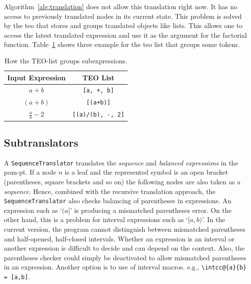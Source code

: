 \documentclass[a4paper,11pt]{article}
\theoremstyle{defTheoStyle}
\theoremstyle{defExampStyle}
\begin{document}
Algorithm~\ref{alg:translation} does not allow this translation right now. It has no access to previously translated nodes in its current state. This problem is solved by the \gls*{teo} that stores and groups translated objects like lists. This allows one to access the latest translated expression and use it as the argument for the factorial function. Table~\ref{tab:teo-list} shows three example for the \gls*{teo} list that groups some tokens.

\begin{table}[ht]
\centering
\begin{tabular}{cc}
	\hline
	Input Expression & TEO List\\
	\hline
	$a+b$ & \verb|[a, +, b]|\\
	$(a+b)$ & \verb|[(a+b)]|\\
	$\frac{a}{b}-2$ & \verb|[(a)/(b), -, 2]|\\
	\hline
\end{tabular}
\caption{How the TEO-list groups subexpressions.}
\label{tab:teo-list}
\end{table}

\subsection{Subtranslators}\label{sec:subtranslators}

A \verb|SequenceTranslator| translates the \textit{sequence} and \textit{balanced expressions} in the \gls*{pom-pt}. If a node $n$ is a leaf and the represented symbol is an open bracket (parentheses, square brackets and so on) the following nodes are also taken as a \textit{sequence}. Hence, combined with the recursive translation approach, the \verb|SequenceTranslator| also checks balancing of parentheses in expressions. An expression such as `$(a]$' is producing a mismatched parentheses error. On the other hand, this is a problem for interval expressions such as `$[a,b)$'. In the current version, the program cannot distinguish between mismatched parentheses and half-opened, half-closed intervals. Whether an expression is an interval or another expression is difficult to decide and can depend on the context. Also, the parentheses checker could simply be deactivated to allow mismatched parentheses in an expression. Another option is to use of interval macros. e.g., \verb|\intcc@{a}{b} = [a,b]|.
\end{document}
